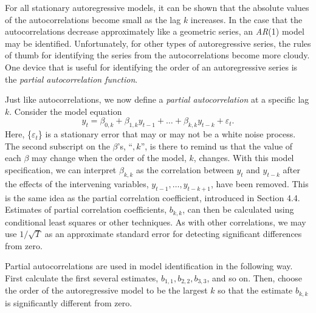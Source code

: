 
For all stationary autoregressive models, it can be shown that the
absolute values of the autocorrelations become small as the lag $k$
increases. In the case that the autocorrelations decrease
approximately like a geometric series, an \textit{AR}(1) model may
be identified. Unfortunately, for other types of autoregressive
series, the rules of thumb for identifying the series from the
autocorrelations become more cloudy. One device that is useful for
identifying the order of an autoregressive series is the
\emph{partial autocorrelation function}.

Just like autocorrelations, we now define a \emph{partial
autocorrelation} at a specific lag $k$. Consider the model equation
\begin{equation*}
y_t=\beta_{0,k}+\beta_{1,k} y_{t-1}+\ldots+\beta_{k,k} y_{t-k} +
\varepsilon_t.
\end{equation*}
Here, \{$\varepsilon_t$\} is a stationary error that may or may not
be a white noise process. The second subscript on the $\beta$'s,
``$,k$'', is there to remind us that the value of each $\beta $ may
change when the order of the model, $k$, changes. With this model
specification, we can interpret $\beta_{k,k}$ as the correlation
between $y_t$ and $y_{t-k}$ after the effects of the intervening
variables, $y_{t-1},\ldots,y_{t-k+1}$, have been removed. This is
the same idea as the partial correlation coefficient, introduced in
Section 4.4. Estimates of partial correlation coefficients,
$b_{k,k}$, can then be calculated using conditional least squares or
other techniques. As with other correlations, we may use
$1/\sqrt{T}$ as an approximate standard error for detecting
significant differences from zero.


Partial autocorrelations are used in model identification in the following
way. First calculate the first several estimates, $b_{1,1},b_{2,2},b_{3,3}$,
and so on. Then, choose the order of the autoregressive model to be the
largest $k$ so that the estimate $b_{k,k}$ is significantly different from
zero.

